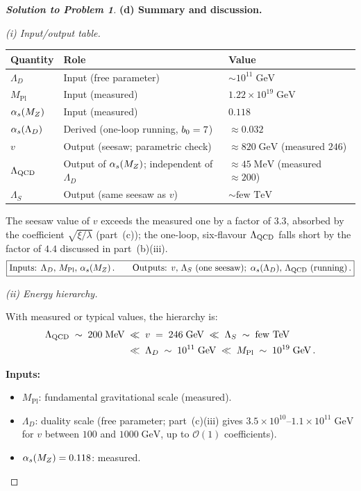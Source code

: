 \documentclass[11pt,a4paper]{article}
\begin{document}
\begin{proof}[\textbf{Solution to Problem 1}]
\bigskip

\textbf{(d) Summary and discussion.}

\textit{(i) Input/output table.}

\renewcommand{\arraystretch}{1.3}
\begin{center}
\begin{tabular}{@{} l l l @{}}
\toprule
\textbf{Quantity} & \textbf{Role} & \textbf{Value} \\
\midrule
$\Lambda_D$ & Input (free parameter) & $\sim 10^{11}\;\text{GeV}$ \\
$M_{\text{Pl}}$ & Input (measured) & $1.22 \times 10^{19}\;\text{GeV}$ \\
$\alpha_s(M_Z)$ & Input (measured) & $0.118$ \\
$\alpha_s(\Lambda_D)$ & Derived (one-loop running, $b_0 = 7$)
  & $\approx 0.032$ \\
$v$ & Output (seesaw; parametric check)
  & $\approx 820\;\text{GeV}$ (measured $246$) \\
$\Lambda_{\mathrm{QCD}}$ & Output of $\alpha_s(M_Z)$; independent of $\Lambda_D$
  & $\approx 45\;\text{MeV}$ (measured $\approx 200$) \\
$\Lambda_S$ & Output (same seesaw as $v$) & $\sim \text{few TeV}$ \\
\bottomrule
\end{tabular}
\end{center}
The seesaw value of $v$ exceeds the measured one by a factor of $3.3$,
absorbed by the coefficient $\sqrt{\xi/\lambda}$ (part~(c)); the
one-loop, six-flavour $\Lambda_{\mathrm{QCD}}$ falls short by the factor of
$4.4$ discussed in part~(b)(iii).
\[
  \boxed{
  \text{Inputs: } \Lambda_D,\, M_{\text{Pl}},\, \alpha_s(M_Z)\,.
  \qquad
  \text{Outputs: } v,\, \Lambda_S \text{ (one seesaw)};\;
  \alpha_s(\Lambda_D),\, \Lambda_{\mathrm{QCD}} \text{ (running)}\,.}
\]

\textit{(ii) Energy hierarchy.}

With measured or typical values, the hierarchy is:
\begin{align*}
  \Lambda_{\mathrm{QCD}} \;\sim\; 200\;\text{MeV}
  &\;\ll\; v \;=\; 246\;\text{GeV}
  \;\ll\; \Lambda_S \;\sim\; \text{few TeV} \\
  &\;\ll\; \Lambda_D \;\sim\; 10^{11}\;\text{GeV}
  \;\ll\; M_{\text{Pl}} \;\sim\; 10^{19}\;\text{GeV}\,.
\end{align*}

\textbf{Inputs:}
\begin{itemize}
  \item $M_{\text{Pl}}$: fundamental gravitational scale (measured).
  \item $\Lambda_D$: duality scale (free parameter; part~(c)(iii) gives
    $3.5 \times 10^{10}$--$1.1 \times 10^{11}\;\text{GeV}$ for
    $v$ between $100$ and $1000\;\text{GeV}$, up to $\mathcal{O}(1)$
    coefficients).
  \item $\alpha_s(M_Z) = 0.118$: measured.
\end{itemize}


\end{proof}
\end{document}
